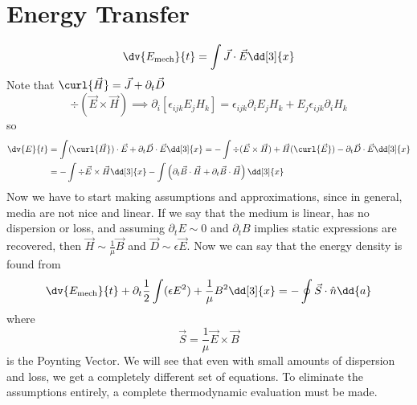 \documentclass[a4paper,twoside,master.tex]{subfiles}
\begin{document}
\section{Energy Transfer}
\label{sec:energy_transfer}
\begin{equation}
    \dv{E_{\text{mech}}}{t} = \int \vec{J} \cdot \vec{E} \dd[3]{x}
\end{equation}
Note that $ \curl{ \vec{H}} = \vec{J} + \partial_t \vec{D} $
\begin{equation}
    \div{( \vec{E} \times \vec{H})} \implies \partial_i[\epsilon_{ijk} E_j H_k] = \epsilon_{ijk} \partial_i E_j H_k + E_j \epsilon_{ijk} \partial_i H_k
\end{equation}
so
\begin{align}
    \dv{E}{t} &= \int (\curl{ \vec{H}}) \cdot \vec{E} + \partial_t \vec{D} \cdot \vec{E} \dd[3]{x} = - \int \div{( \vec{E} \times \vec{H})} + \vec{H} (\curl{ \vec{E}})- \partial_t \vec{D} \cdot \vec{E} \dd[3]{x}\\
    &= - \int \div{ \vec{E} \times \vec{H}} \dd[3]{x} - \int \left( \partial_t \vec{B} \cdot \vec{H} + \partial_t \vec{B} \cdot \vec{H} \right) \dd[3]{x}
\end{align}
Now we have to start making assumptions and approximations, since in general, media are not nice and linear. If we say that the medium is linear, has no dispersion or loss, and assuming $ \partial_t E \sim 0 $ and $ \partial_t B $ implies static expressions are recovered, then $ \vec{H} \sim \frac{1}{\mu} \vec{B} $ and $ \vec{D} \sim \epsilon \vec{E} $. Now we can say that the energy density is found from
\begin{equation}
    \dv{E_{\text{mech}}}{t}+ \partial_t \frac{1}{2} \int (\epsilon E^2)+ \frac{1}{\mu} B^2 \dd[3]{x} = - \oint \vec{S} \cdot \hat{n} \dd{a}
\end{equation}
where
\begin{equation}
    \vec{S} = \frac{1}{\mu} \vec{E} \times \vec{B}
\end{equation}
is the Poynting Vector. We will see that even with small amounts of dispersion and loss, we get a completely different set of equations. To eliminate the assumptions entirely, a complete thermodynamic evaluation must be made.
\end{document}
